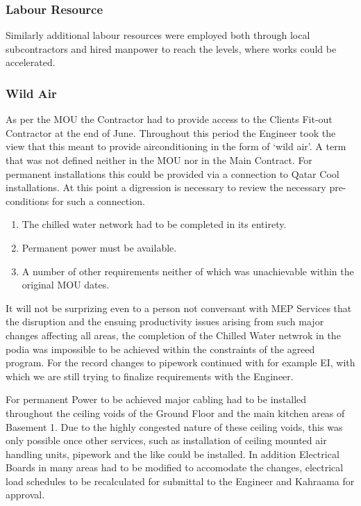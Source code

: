 \subsubsection{Labour Resource}

Similarly additional labour resources were employed both through local subcontractors and hired manpower to reach the levels, where works could be accelerated. 

\subsubsection{Wild Air}

As per the MOU the Contractor had to provide access to the Clients Fit-out Contractor at the end of June. Throughout this period the Engineer took the view that this meant to provide airconditioning in the form of `wild air'. A term that was not defined neither in the MOU nor in the Main Contract. For permanent installations this could be provided via a connection to Qatar Cool installations.
At this point a digression is necessary to review the necessary pre-conditions for such a connection.

\begin{enumerate}
\item The chilled water network had to be completed in its entirety.
\item Permanent power must be available.
\item A number of other requirements neither of which was unachievable within the original MOU dates.
\end{enumerate}


It will not be surprizing even to a person not conversant with MEP Services that the disruption and the ensuing productivity issues arising from such major changes affecting all areas, the completion of the Chilled Water netwrok in the podia was impossible to be achieved within the constraints of the agreed program. For the record changes to pipework continued with for example EI, with which we are still trying to finalize requirements with the Engineer.

For permanent Power to be achieved major cabling had to be installed throughout the ceiling voids of the Ground Floor and the main kitchen areas of Basement 1. Due to the highly congested nature of these ceiling voids, this was only possible once other services, such as installation of ceiling mounted air handling units, pipework and the like could be installed. In addition Electrical Boards in many areas had to be modified to accomodate the changes, electrical load schedules to be recalculated for submittal to the Engineer and Kahraama for approval. 

